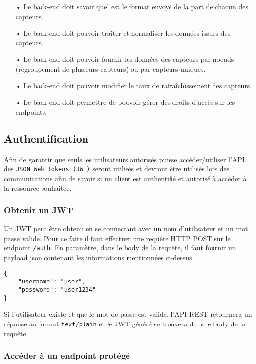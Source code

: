 \begin{itemize}
\item[•] Le back-end doit savoir quel est le format envoyé de la part de chacun des capteurs.
\item[•] Le back-end doit pouvoir traiter et normaliser les données issues des capteurs.
\item[•] Le back-end doit pouvoir fournir les données des capteurs par noeuds (regroupement de plusieurs capteurs) ou par capteurs uniques.
\item[•] Le back-end doit pouvoir modifier le taux de rafraîchissement des capteurs.
\item[•] Le back-end doit permettre de pouvoir gérer des droits d'accès sur les endpoints.
\end{itemize}
   
\subsection{Authentification}
\label{ssec:be-auth}

Afin de garantir que seuls les utilisateurs autorisés puisse accéder/utiliser l'API, des \texttt{JSON Web Tokens (JWT)} seront utilisés et devront être utilisés lors des communications afin de savoir si un client est authentifié et autorisé à accéder à la ressource souhaitée.

\subsubsection{Obtenir un JWT}

Un JWT peut être obtenu en se connectant avec un nom d'utilisateur et un mot passe valide. Pour ce faire il faut effectuer une requête HTTP POST sur le endpoint \texttt{/auth}. En paramètre, dans le body de la requête, il faut fournir un payload json contenant les informations mentionnées ci-dessus.
\medskip

\begin{lstlisting}[style=Java]
{
    "username": "user",
    "password": "user1234"
}
\end{lstlisting}

Si l'utilisateur existe et que le mot de passe est valide, l'API REST retournera un réponse au format \texttt{text/plain} et le JWT généré se trouvera dans le body de la requête.

\subsubsection{Accéder à un endpoint protégé}

